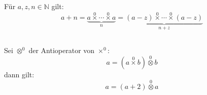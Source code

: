 \documentclass{article}
\begin{document}
\subsection{}
F\"ur $a, z, n \in \mathbb{N}$ gilt:
\[ a + n = \underbrace{a \operatorname*{\times}^0 \dotsb \operatorname*{\times}^0 a}_n =
   \underbrace{\left(a - z\right) \operatorname*{\times}^0 \dotsb \operatorname*{\times}^0 \left(a - z\right)}_{n+z} \]
\subsection{}
Sei $\operatorname*{\otimes}^0$ der Antioperator von $\operatorname*{\times}^0$:
\[ a = \left(a\operatorname*{\times}^0 b\right)\operatorname*{\otimes}^0 b \]
dann gilt:
\[ a = \left(a+2\right)\operatorname*{\otimes}^0 a \]
\end{document}
